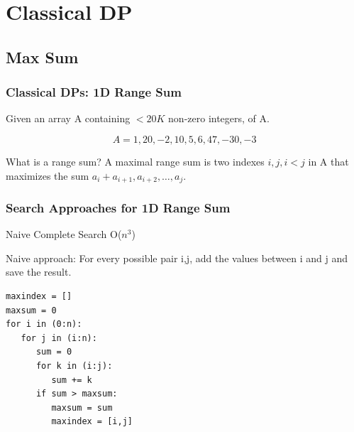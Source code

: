 \documentclass{beamer}
\begin{document}


\section{Classical DP}
\subsection{Max Sum}

\begin{frame}
  \frametitle{Classical DPs: 1D Range Sum}

  Given an array A containing $< 20K$ non-zero integers,
   of A.

  \begin{equation*}
    A = { 1, 20, -2, 10, 5, 6, 47, -30, -3}
  \end{equation*}

  \vfill
  
  \begin{block}{What is a range sum?}
    A maximal range sum is two indexes $i,j, i < j$ in A that maximizes
    the sum $a_i + a_{i+1}, a_{i+2}, \ldots, a_j$.
  \end{block}
\end{frame}

\begin{frame}[fragile]
  \frametitle{Search Approaches for 1D Range Sum}
  \begin{block}{Naive Complete Search O($n^3$)}

    Naive approach: For every possible pair i,j, add the values
    between i and j and save the result.

{\smaller
\begin{verbatim}
maxindex = []
maxsum = 0
for i in (0:n):
   for j in (i:n):
      sum = 0
      for k in (i:j):
         sum += k
      if sum > maxsum:
         maxsum = sum
         maxindex = [i,j]
\end{verbatim}
}
  \end{block}
\end{frame}
\end{document}
